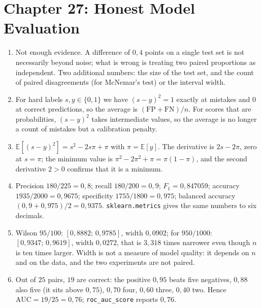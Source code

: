 \section*{Chapter 27: Honest Model Evaluation}
\begin{enumerate}[label=\textbf{27.\arabic*}]
  \item Not enough evidence. A difference of $0{,}4$ points on a single test set is not
        necessarily beyond noise; what is wrong is treating two paired proportions
        as independent. Two additional numbers: the size of the test set, and the count of
        paired disagreements (for McNemar's test) or the interval width.

  \item For hard labels $s,y\in\{0,1\}$ we have $(s-y)^{2}=1$ exactly at
        mistakes and $0$ at correct predictions, so the average is
        $(\mathrm{FP}+\mathrm{FN})/n$. For scores that are probabilities, $(s-y)^{2}$
        takes intermediate values, so the average is no longer a count of mistakes
        but a calibration penalty.

  \item $\mathbb{E}[(s-y)^{2}]=s^{2}-2s\pi+\pi$ with $\pi=\mathbb{E}[y]$.
        The derivative is $2s-2\pi$, zero at $s=\pi$; the minimum value is
        $\pi^{2}-2\pi^{2}+\pi=\pi(1-\pi)$, and the second derivative $2>0$ confirms
        that it is a minimum.

  \item Precision $180/225=0{,}8$; recall $180/200=0{,}9$; $F_{1}=0{,}847059$;
        accuracy $1935/2000=0{,}9675$; specificity $1755/1800=0{,}975$; balanced accuracy
        $(0{,}9+0{,}975)/2=0{,}9375$. \texttt{sklearn.metrics} gives the
        same numbers to six decimals.

  \item Wilson $95/100$: $[0{,}8882;\,0{,}9785]$, width $0{,}0902$; for
        $950/1000$: $[0{,}9347;\,0{,}9619]$, width $0{,}0272$, that is $3{,}318$
        times narrower even though $n$ is ten times larger. Width is not a measure of
        model quality: it depends on $n$ and on the data, and the two experiments are
        not paired.

  \item 
Out of $25$ pairs, $19$ are correct: the positive $0{,}95$ beats five
        negatives, $0{,}88$ also five (it sits above $0{,}75$), $0{,}70$ four,
        $0{,}60$ three, $0{,}40$ two. Hence $\mathrm{AUC}=19/25=0{,}76$;
        \texttt{roc\_auc\_score} reports $0{,}76$.


\end{enumerate}

